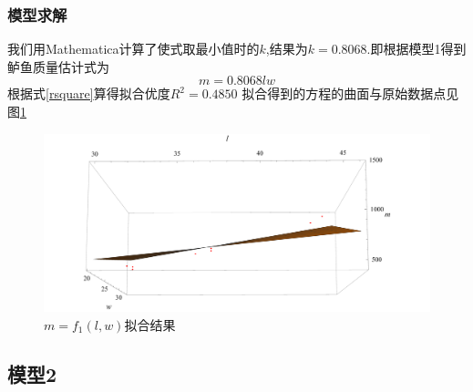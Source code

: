 \documentclass[UTF8,a4paper]{ctexart}
\numberwithin{equation}{section}%
\numberwithin{table}{section}
\numberwithin{figure}{section}
\begin{document}
\FloatBarrier%
\subsubsection{模型求解}
我们用Mathematica计算了使式取最小值时的$k$,结果为$k=0.8068$.即根据模型1得到鲈鱼质量估计式为\begin{equation}
	m=0.8068 l w
	\label{muxing1}
\end{equation}
根据式\eqref{rsquare}算得拟合优度$R^2=0.4850$
拟合得到的方程的曲面与原始数据点见图\ref{nihetu1}
\begin{figure}[!htp]
	\centering
	\includegraphics[width=15cm]{nihetu1.pdf}
	\caption{$m=f_1(l,w)$拟合结果}
	\label{nihetu1}
\end{figure}
\subsection{模型2}
\end{document}
